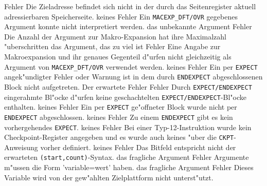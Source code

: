 \documentclass[12pt,a4paper,twoside]{report}
\newcommand{\tty}[1]{{\tt #1}}
\begin{document}
\begin{description}
               {Fehler}
               {Die Zieladresse befindet sich nicht in der durch
                das Seitenregister aktuell adressierbaren
                Speicherseite.}
               {keines}
               {Fehler}
               {Ein \tty{MACEXP\_DFT/OVR} gegebenes Argument konnte nicht
                interpretiert werden.}
               {das unbekannte Argument}
               {Fehler}
               {Die Anzahl der Argument zur Makro-Expansion hat ihre Maximalzahl "uberschritten}
               {das Argument, das zu viel ist}
               {Fehler}
               {Eine Angabe zur Makroexpansion und ihr genaues
                Gegenteil d"urfen nicht gleichzeitig als Argument
                von \tty{MACEXP\_DFT/OVR} verwendet werden.}
               {keines}
               {Fehler}
               {Ein per {\tt EXPECT} angek"undigter Fehler oder Warnung ist
                in dem durch {\tt ENDEXPECT} abgeschlossenen Block nicht aufgetreten.}
               {Der erwartete Fehler}
               {Fehler}
               {Durch {\tt EXPECT/ENDEXPECT} eingerahmte Bl"ocke d"urfen keine
                geschachtelten {\tt EXPECT/ENDEXPECT}-Bl"ocke enthalten.}
               {keines}
               {Fehler}
               {Ein per {\tt EXPECT} ge"offneter Block wurde nicht per
                {\tt ENDEXPECT} abgeschlossen.}
               {keines}
               {Fehler}
               {Zu einem {\tt ENDEXPECT} gibt es kein vorhergehendes {\tt EXPECT}.}
               {keines}
               {Fehler}
               {Bei einer Typ-12-Instruktion wurde kein Checkpoint-Register angegeben
                und es wurde auch keines "uber die {\tt CKPT}-Anweisung vorher definiert.}
               {keines}
               {Fehler}
               {Das Bitfeld entspricht nicht der erwarteten {\tt (start,count)}-Syntax.}
               {das fragliche Argument}
               {Fehler}
               {Argumente m"ussen die Form 'variable=wert' haben.}
               {das fragliche Argument}
               {Fehler}
               {Dieses Variable wird von der gew"ahlten Zielplattform nicht unterst"utzt.}

\end{description}
\end{document}

